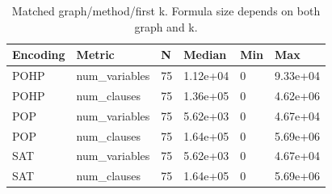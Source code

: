 \begin{table}[htbp]
\centering
\caption{Matched graph/method/first k. Formula size depends on both graph and k.}
\label{tab:p1-Repeated-exploratory-formula-sizes}
\begin{tabular}{llllll}
\hline
Encoding & Metric & N & Median & Min & Max \\
\hline
POHP & num\_variables & 75 & 1.12e+04 & 0 & 9.33e+04 \\
POHP & num\_clauses & 75 & 1.36e+05 & 0 & 4.62e+06 \\
POP & num\_variables & 75 & 5.62e+03 & 0 & 4.67e+04 \\
POP & num\_clauses & 75 & 1.64e+05 & 0 & 5.69e+06 \\
SAT & num\_variables & 75 & 5.62e+03 & 0 & 4.67e+04 \\
SAT & num\_clauses & 75 & 1.64e+05 & 0 & 5.69e+06 \\
\hline
\end{tabular}
\end{table}

